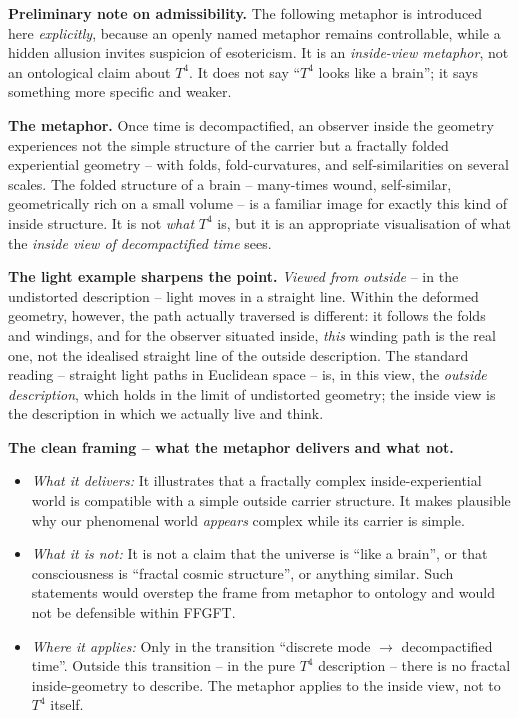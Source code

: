 \textbf{Preliminary note on admissibility.} The following metaphor is
introduced here \emph{explicitly}, because an openly named metaphor
remains controllable, while a hidden allusion invites suspicion of
esotericism. It is an \emph{inside-view metaphor}, not an ontological
claim about $T^4$. It does not say ``$T^4$ looks like a brain''; it
says something more specific and weaker.

\textbf{The metaphor.} Once time is decompactified, an observer
inside the geometry experiences not the simple structure of the
carrier but a fractally folded experiential geometry -- with folds,
fold-curvatures, and self-similarities on several scales. The
folded structure of a brain -- many-times wound, self-similar,
geometrically rich on a small volume -- is a familiar image for
exactly this kind of inside structure. It is not \emph{what} $T^4$
is, but it is an appropriate visualisation of what the
\emph{inside view of decompactified time} sees.

\textbf{The light example sharpens the point.} \emph{Viewed from
outside} -- in the undistorted description -- light moves in a
straight line. Within the deformed geometry, however, the path
actually traversed is different: it follows the folds and windings,
and for the observer situated inside, \emph{this} winding path is
the real one, not the idealised straight line of the outside
description. The standard reading -- straight light paths in
Euclidean space -- is, in this view, the \emph{outside description},
which holds in the limit of undistorted geometry; the inside view
is the description in which we actually live and think.

\textbf{The clean framing -- what the metaphor delivers and what
not.}

\begin{itemize}[leftmargin=2em,itemsep=2pt,topsep=2pt]
  \item \emph{What it delivers:} It illustrates that a fractally
        complex inside-experiential world is compatible with a
        simple outside carrier structure. It makes plausible why
        our phenomenal world \emph{appears} complex while its
        carrier is simple.
  \item \emph{What it is not:} It is not a claim that the universe
        is ``like a brain'', or that consciousness is ``fractal
        cosmic structure'', or anything similar. Such statements
        would overstep the frame from metaphor to ontology and
        would not be defensible within FFGFT.
  \item \emph{Where it applies:} Only in the transition ``discrete
        mode $\to$ decompactified time''. Outside this transition --
        in the pure $T^4$ description -- there is no fractal
        inside-geometry to describe. The metaphor applies to the
        inside view, not to $T^4$ itself.
\end{itemize}

